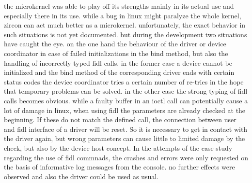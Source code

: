 %


the microkernel was able to play off its strengths mainly in its actual use and especially there in its use.
while a bug in linux might paralyze the whole kernel, zircon can act much better as a microkernel.
unfortunately, the exact behavior in such situations is not yet documented.
but during the development two situations have caught the eye.
on the one hand the behaviour of the driver or device coordinator in case of failed initializations in the bind method, but also the handling of incorrectly typed fidl calls.
in the former case a device cannot be initialized and the bind method of the corresponding driver ends with certain status codes the device coordinator tries a certain number of re-tries in the hope that temporary problems can be solved.
in the other case the strong typing of fidl calls becomes obvious. while a faulty buffer in an ioctl call can potentially cause a lot of damage in linux, when using fidl the parameters are already checked at the beginning.
If these do not match the defined call, the connection between user and fidl interface of a driver will be reset.
So it is necessary to get in contact with the driver again, but wrong parameters can cause little to limited damage by the check, but also by the device host concept.
In the attempts of the case study regarding the use of fidl commnads, the crashes and errors were only requested on the basis of informative log messages from the console.
no further effects were observed and also the driver could be used as usual.


